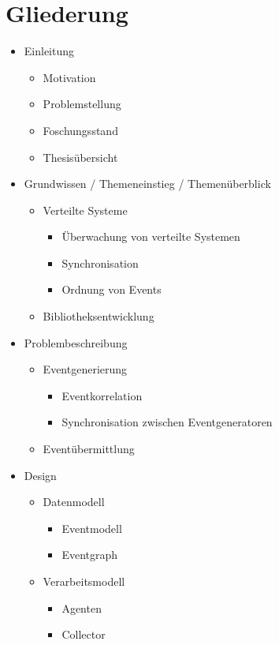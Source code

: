 \documentclass[a4paper]{article}
\begin{document}
\section{Gliederung}
\label{section:Erkenntnisinteresse}
\begin{itemize}
	\item Einleitung
		\begin{itemize}
			\item Motivation
			\item Problemstellung
			\item Foschungsstand
			\item Thesisübersicht
		\end{itemize}
	\item Grundwissen / Themeneinstieg / Themenüberblick
		\begin{itemize}
			\item Verteilte Systeme
			\begin{itemize}
				\item Überwachung von verteilte Systemen
				\item Synchronisation
				\item Ordnung von Events
			\end{itemize}
			\item Bibliotheksentwicklung
		\end{itemize}
	\item Problembeschreibung
		\begin{itemize}
			\item Eventgenerierung
			\begin{itemize}
				\item Eventkorrelation
				\item Synchronisation zwischen Eventgeneratoren
			\end{itemize}
			\item Eventübermittlung
		\end{itemize}
	\item Design
	\begin{itemize}
		\item Datenmodell
		\begin{itemize}
			\item Eventmodell
			\item Eventgraph
		\end{itemize}
		\item Verarbeitsmodell
		\begin{itemize}
			\item Agenten
			\item Collector

\end{itemize}
\end{itemize}
\end{itemize}
\end{document}

